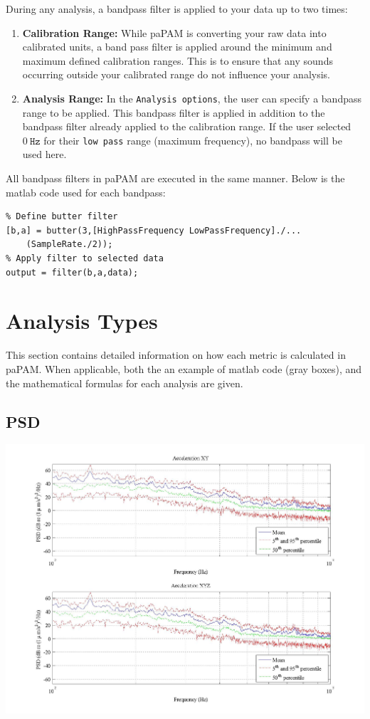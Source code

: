 \documentclass[11pt]{report}
\begin{document}
During any analysis, a bandpass filter is applied to your data up to two times:
\begin{enumerate}
\item \textbf{Calibration Range:}  While paPAM is converting your raw data into calibrated units, a band pass filter is applied around the minimum and maximum defined calibration ranges.  This is to ensure that any sounds occurring outside your calibrated range do not influence your analysis.
\item \textbf{Analysis Range:} In the \texttt{Analysis options}, the user can specify a bandpass range to be applied.  This bandpass filter is applied in addition to the bandpass filter already applied to the calibration range.  If the user selected $0 \ \mathtt{Hz}$ for their \texttt{low pass} range (maximum frequency), no bandpass will be used here.
\end{enumerate}
\begin{samepage}
All bandpass filters in paPAM are executed in the same manner.  Below is the matlab code used for each bandpass:

\begin{lstlisting}
% Define butter filter
[b,a] = butter(3,[HighPassFrequency LowPassFrequency]./...
	(SampleRate./2));
% Apply filter to selected data
output = filter(b,a,data);
\end{lstlisting}
\end{samepage}

\chapter{Analysis Types} \label{AnalysisTypes}

This section contains detailed information on how each metric is calculated in paPAM.  When applicable, both the an example of matlab code (gray boxes), and the mathematical formulas for each analysis are given.

\section{PSD}

\begin{center}
\includegraphics[width = \textwidth ]{7.jpeg}
\end{center}
\end{document}
